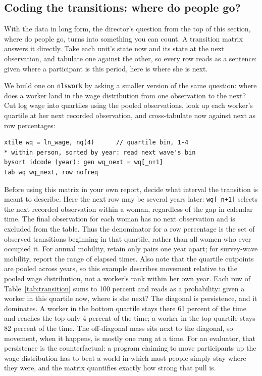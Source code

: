 \documentclass[
    a4paper,
    fontsize=10pt,
    twoside=true,
    numbers=noenddot,
]{kaobook}
\begin{document}
\subsection{Coding the transitions: where do people go?}\label{sec:ch06-transitions}
With the data in long form, the director's question from the top of this section, where do people go, turns into something you can count. A transition matrix answers it directly. Take each unit's state now and its state at the next observation, and tabulate one against the other, so every row reads as a sentence: given where a participant is this period, here is where she is next.

We build one on \texttt{nlswork} by asking a smaller version of the same question: where does a worker land in the wage distribution from one observation to the next? Cut log wage into quartiles using the pooled observations, look up each worker's quartile at her next recorded observation, and cross-tabulate now against next as row percentages:
\par
{\footnotesize
\begin{verbatim}
xtile wq = ln_wage, nq(4)      // quartile bin, 1-4
* within person, sorted by year: read next wave's bin
bysort idcode (year): gen wq_next = wq[_n+1]
tab wq wq_next, row nofreq
\end{verbatim}
}

Before using this matrix in your own report, decide what interval the transition is meant to describe. Here the next row may be several years later: \texttt{wq[\_n+1]} selects the next recorded observation within a woman, regardless of the gap in calendar time. The final observation for each woman has no next observation and is excluded from the table. Thus the denominator for a row percentage is the set of observed transitions beginning in that quartile, rather than all women who ever occupied it. For annual mobility, retain only pairs one year apart; for survey-wave mobility, report the range of elapsed times. Also note that the quartile cutpoints are pooled across years, so this example describes movement relative to the pooled wage distribution, not a worker's rank within her own year.
Each row of Table~\ref{tab:transition} sums to 100 percent and reads as a probability: given a worker in this quartile now, where is she next? The diagonal is persistence, and it dominates. A worker in the bottom quartile stays there 61 percent of the time and reaches the top only 4 percent of the time; a worker in the top quartile stays 82 percent of the time. The off-diagonal mass sits next to the diagonal, so movement, when it happens, is mostly one rung at a time. For an evaluator, that persistence is the counterfactual: a program claiming to move participants up the wage distribution has to beat a world in which most people simply stay where they were, and the matrix quantifies exactly how strong that pull is.
\end{document}
